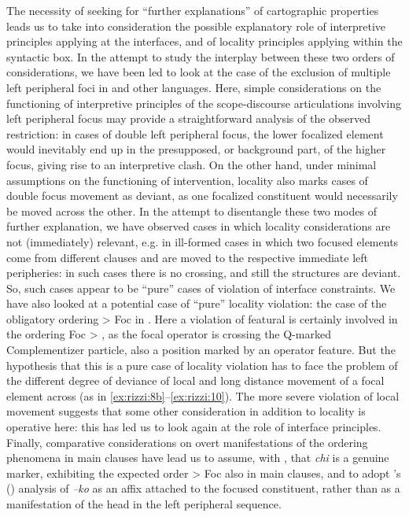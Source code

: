 \documentclass[output=paper]{LSP/langsci}
\begin{document}
The necessity of seeking for “further explanations” of cartographic properties leads us to take into consideration the possible explanatory role of interpretive principles applying at the interfaces, and of locality principles applying within the syntactic box. In the attempt to study the interplay between these two orders of considerations, we have been led to look at the case of the exclusion of multiple left peripheral foci in  and other languages. Here, simple considerations on the functioning of interpretive principles of the scope-discourse articulations involving left peripheral focus may provide a straightforward analysis of the observed restriction: in cases of double left peripheral focus, the lower focalized element would inevitably end up in the presupposed, or background part, of the higher focus, giving rise to an interpretive clash. On the other hand, under minimal assumptions on the functioning of intervention, locality also marks cases of double focus movement as deviant, as one focalized constituent would necessarily be moved across the other. In the attempt to disentangle these two modes of further explanation, we have observed cases in which locality considerations are not (immediately) relevant, e.g. in ill-formed cases in which two focused elements come from different clauses and are moved to the respective immediate left peripheries: in such cases there is no crossing, and still the structures are deviant. So, such cases appear to be “pure” cases of violation of interface constraints. We have also looked at a potential case of “pure” locality violation: the case of the obligatory ordering  > Foc in .  Here a violation of featural  is certainly involved in the ordering Foc > , as the focal operator is crossing the Q-marked Complementizer particle, also a position marked by an operator feature. But the hypothesis that this is a pure case of locality violation has to face the problem of the different degree of deviance of local and long distance movement of a focal element across  (as in \ref{ex:rizzi:8b}--\ref{ex:rizzi:10}). The more severe violation of local movement suggests that some other consideration in addition to locality is operative here: this has led us to look again at the role of interface principles.  Finally, comparative considerations on overt manifestations of the ordering phenomena in main clauses have lead us to assume, with  \citet{BianchiCruschina2016}, that  \textit{chi} is a genuine  marker, exhibiting the expected order  > Foc also in main clauses, and to adopt \citeauthor{Holmberg2013}'s (\citeyear{Holmberg2013, Holmberg2014finnishquestion}) analysis of  \textit{–ko} as an affix attached to the focused constituent, rather than as a manifestation of the  head in the left peripheral sequence.
\end{document}

